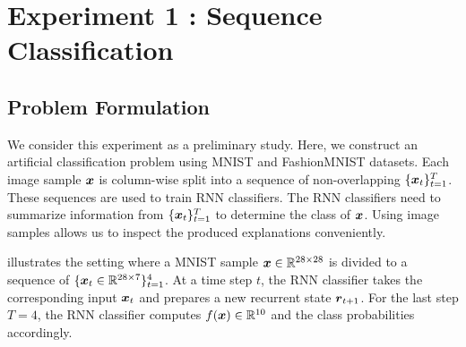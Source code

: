 

 

\section{Experiment 1 : Sequence Classification}
\label{sec:exp1}

\subsection{Problem Formulation}
We consider this experiment as a preliminary study. Here, we construct an artificial classification problem using MNIST and FashionMNIST datasets. Each image sample $\boldsymbol{x}$ is column-wise split into a sequence of non-overlapping $\{ \boldsymbol{x}_t \}_{t=1}^{T}$. These sequences are used to train RNN classifiers. The RNN classifiers need to summarize information from $\{ \boldsymbol{x}_t \}_{t=1}^{T}$ to determine the class of $\boldsymbol{x}$.  Using image samples allows us to inspect the produced explanations conveniently.

\addfigure{\ref{fig:artificial_problem}} illustrates the setting where a MNIST sample $ \patvector{x} \in \mathbb{R}^{28 \times 28}$ is divided to a sequence of $\{ \patvector{x}_t \in   \mathbb{R}^{28 \times 7} \}_{t=1} ^ 4$. At  a time step $t$, the RNN classifier takes the corresponding input $\patvector{x}_t$ and prepares a new recurrent state $\patvector{r}_{t+1}$. For the last step $T = 4$, the RNN classifier computes $f(\boldsymbol{x}) \in \mathbb{R}^{10}$ and the class probabilities accordingly.


